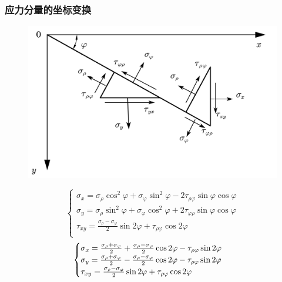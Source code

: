 \subsubsection{应力分量的坐标变换}
\begin{figure}[!h]
\centering
\includegraphics[scale=0.5]{figure/4-3.png}
\caption{}
\end{figure}
\begin{equation}
\begin{cases}
\sigma _x=\sigma _{\rho}\cos ^2\varphi +\sigma _{\varphi}\sin ^2\varphi -2\tau _{\rho \varphi}\sin \varphi \cos \varphi\\
\sigma _y=\sigma _{\rho}\sin ^2\varphi +\sigma _{\varphi}\cos ^2\varphi +2\tau _{\varphi \rho}\sin \varphi \cos \varphi\\
\tau _{xy}=\frac{\sigma _{\rho}-\sigma _{\varphi}}{2}\sin 2\varphi +\tau _{\rho \varphi}\cos 2\varphi\\
\end{cases}
\end{equation}
\begin{equation}
\begin{cases}
\sigma _x=\frac{\sigma _{\rho}+\sigma _{\varphi}}{2}+\frac{\sigma _{\rho}-\sigma _{\varphi}}{2}\cos 2\varphi -\tau _{\rho \varphi}\sin 2\varphi\\
\sigma _y=\frac{\sigma _{\rho}+\sigma _{\varphi}}{2}-\frac{\sigma _{\rho}-\sigma _{\varphi}}{2}\cos 2\varphi -\tau _{\rho \varphi}\sin 2\varphi\\
\tau _{xy}=\frac{\sigma _{\rho}-\sigma _{\varphi}}{2}\sin 2\varphi +\tau _{\rho \varphi}\cos 2\varphi\\
\end{cases}
\\
\end{equation}
